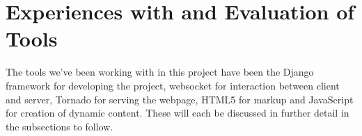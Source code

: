 \section{Experiences with and Evaluation of Tools}
The tools we've been working with in this project have been the Django framework for developing the project, websocket for interaction between client and server, Tornado for serving the webpage, HTML5 for markup and JavaScript for creation of dynamic content. These will each be discussed in further detail in the subsections to follow.



